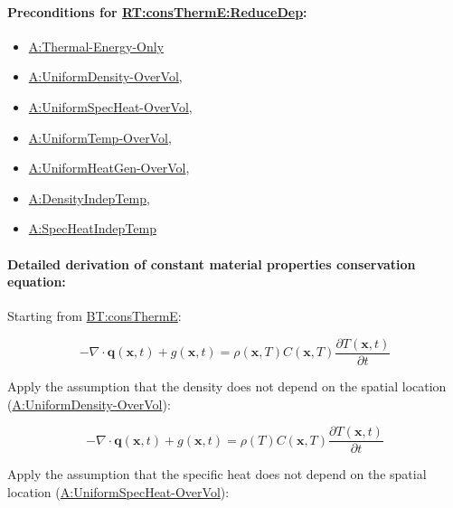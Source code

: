 \documentclass[12pt]{article}
\begin{document}

\paragraph{Preconditions for \hyperref[RT:consThermE:ReduceDep]{RT:consThermE:ReduceDep}:}
\label{RT:consThermE:ReduceDepPrecond}

\begin{itemize}
\item \hyperref[assumpTEO]{A:Thermal-Energy-Only}
\item \hyperref[assumpUnifDens]{A:UniformDensity-OverVol},
\item \hyperref[assumpUnifSpecHeat]{A:UniformSpecHeat-OverVol},
\item \hyperref[assumpUnifTemp]{A:UniformTemp-OverVol},
\item \hyperref[assumpUnifHeatGen]{A:UniformHeatGen-OverVol},
\item \hyperref[assumpDensIndepT]{A:DensityIndepTemp},
\item \hyperref[assumpSpecHeatIndepT]{A:SpecHeatIndepTemp} 
\end{itemize}


\paragraph{Detailed derivation of constant material properties conservation equation:}
\label{RT:consThermE:ReduceDep:Deriv}

Starting from \hyperref[BT:consThermE]{BT:consThermE}:

\begin{displaymath}
-{\nabla \cdot \mathbf{q} (\mathbf{x}, t)} + g(\mathbf{x}, t) = \rho (\mathbf{x}, T) C (\mathbf{x}, T) \frac{\partial T(\mathbf{x}, t)}{\partial t}
\end{displaymath}

\noindent Apply the assumption that the density does not depend on the spatial location
(\hyperref[assumpUnifDens]{A:UniformDensity-OverVol}):

\begin{displaymath}
-{\nabla \cdot \mathbf{q} (\mathbf{x}, t)} + g(\mathbf{x}, t) = \rho (T) C (\mathbf{x}, T) \frac{\partial T(\mathbf{x}, t)}{\partial t}
\end{displaymath}

\noindent Apply the assumption that the specific heat does not depend on the spatial
location (\hyperref[assumpUnifSpecHeat]{A:UniformSpecHeat-OverVol}):
\end{document}
